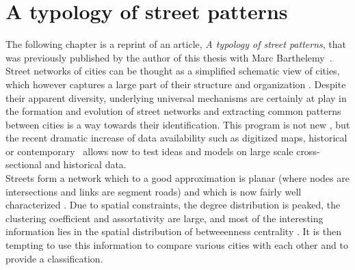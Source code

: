 \chapter{A typology of street patterns}
\label{chap:typology}

The following chapter is a reprint of an article, \emph{A typology of street
patterns}, that was previously published by the author of this
thesis with Marc Barthelemy~\cite{Louf:2014}.\\

Street networks of cities can be thought as a simplified schematic view of
cities, which however captures a large part of their structure and organization
\cite{Southworth:2003}.  Despite their apparent diversity, underlying universal
mechanisms are certainly at play in the formation and evolution of street
networks and extracting common patterns between cities is a way towards their
identification. This program is not new \cite{Haggett:1969}, but the
recent dramatic increase  of data availability such as digitized maps,
historical or
contemporary~\cite{Strano:2012,Barthelemy:2013,Porta:2014} allows now to test
ideas and models on large scale cross-sectional and historical data.\\

Streets form a network which to a good approximation is planar (where nodes are
intersections and links are segment roads) and which is now fairly well
characterized
\cite{Jiang:2004,Rosvall:2005,Porta:2006,Porta:2006b,Lammer:2006,Crucitti:2006,Cardillo:2006,Xie:2007,Jiang:2007,Masucci:2009,Chan:2011,Courtat:2011}.
Due to spatial constraints, the degree distribution is peaked, the clustering
coefficient and assortativity are large, and most of the interesting information
lies in the spatial distribution of betweeenness centrality
\cite{Barthelemy:2011}. It is then tempting to use this information to compare
various cities with each other and to provide a classification. \\

